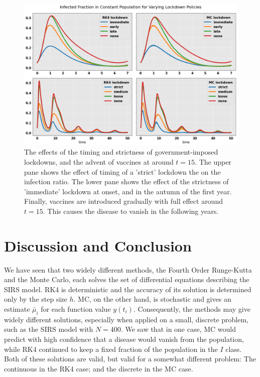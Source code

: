 \documentclass[]{article}
\begin{document}
\begin{figure}[!h]
	\centering
	\includegraphics[width=1\linewidth]{./figs/covid-infection-sim.png}
	\caption{The effects of the timing and strictness of government-imposed lockdowns, and the advent of vaccines at around $t=15$. The upper pane shows the effect of timing of a 'strict' lockdown the on the infection ratio. The lower pane shows the effect of the strictness of 'immediate' lockdown at onset, and in the autumn of the first year. Finally, vaccines are introduced gradually with full effect around $t=15$. This causes the disease to vanish in the following years.}
	\label{fig:covid-infection-sim}
\end{figure}


\clearpage
\section{Discussion and Conclusion} \label{sec:conclusion}


We have seen that two widely different methods, the Fourth Order Runge-Kutta and the Monte Carlo, each solves the set of differential equations describing the SIRS model. RK4 is deterministic and the accuracy of its solution is determined only by the step size $h$. MC, on the other hand, is stochastic and gives an estimate $\bar{\mu}_i$ for each function value $y(t_i)$. Consequently, the methods may give widely different solutions, especially when applied on a small, discrete problem, such as the SIRS model with $N=400$. We saw that in one case, MC would predict with high confidence that a disease would vanish from the population, while RK4 continued to keep a fixed fraction of the population in the $I$ class. Both of these solutions are valid, but valid for a somewhat different problem: The continuous in the RK4 case; and the discrete in the MC case. 
\end{document}
